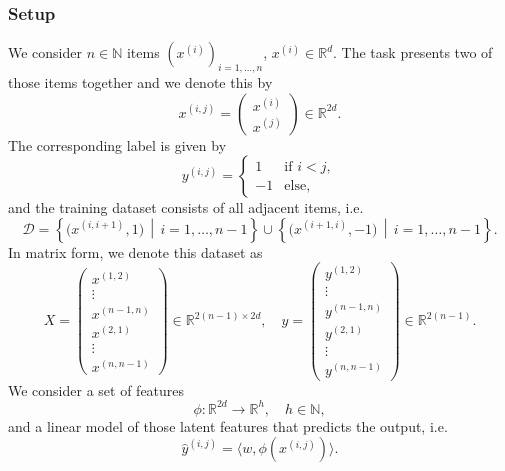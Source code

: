 \documentclass{article}
\theoremstyle{plain}
\begin{document}
\subsubsection{Setup}
\label{app:ti_setup}
We consider $n\in\mathbb{N}$ items $(x^{(i)})_{i=1,\dotsc,n}$, $x^{(i)}\in\mathbb{R}^d$. The task presents two of those items together and we denote this by
\begin{equation}
    x^{(i,j)}=\begin{pmatrix}x^{(i)}\\x^{(j)}\end{pmatrix}\in\mathbb{R}^{2d}.
\end{equation}
The corresponding label is given by
\begin{equation}
    y^{(i,j)}=\begin{cases}1&\text{if }i<j,\\-1&\text{else,}\end{cases}
\end{equation}
and the training dataset consists of all adjacent items, i.e.\
\begin{equation}
    \mathcal{D}=\left\{\bigl(x^{(i,i+1)},1\bigr)\,\middle|\,i=1,\dotsc,n-1\right\}\cup\left\{\bigl(x^{(i+1,i)},-1\bigr)\,\middle|\,i=1,\dotsc,n-1\right\}.
\end{equation}
In matrix form, we denote this dataset as
\begin{equation}
    X=\begin{pmatrix}x^{(1,2)}\\\vdots\\x^{(n-1,n)}\\x^{(2,1)}\\\vdots\\x^{(n,n-1)}\end{pmatrix}\in\mathbb{R}^{2(n-1)\times 2d},\quad
    y=\begin{pmatrix}y^{(1,2)}\\\vdots\\y^{(n-1,n)}\\y^{(2,1)}\\\vdots\\y^{(n,n-1)}\end{pmatrix}\in\mathbb{R}^{2(n-1)}.
\end{equation}
We consider a set of features
\begin{equation}
    \phi:\mathbb{R}^{2d}\to\mathbb{R}^h,\quad h\in\mathbb{N},
\end{equation}
and a linear model of those latent features that predicts the output, i.e.\
\begin{equation}
    \hat{y}^{(i,j)}=\langle w,\phi(x^{(i,j)})\rangle.
\end{equation}
\end{document}
